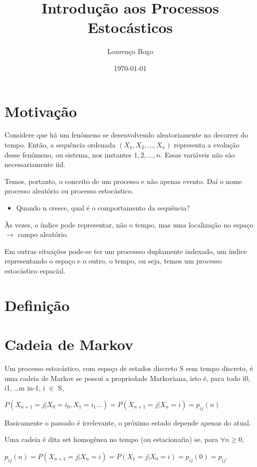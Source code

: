 \documentclass[11pt]{article}
\author{Lourenço Bogo}
\date{\today}
\title{Introdução aos Processos Estocásticos}
\begin{document}
\maketitle

\section{Motivação}
\label{sec:org6c1afc7}
Considere que há um fenômeno se desenvolvendo aleatoriamente no decorrer do tempo.
Então, a sequência ordenada \((X_1, X_2, \dots, X_n)\) representa a evolução desse fenômeno, ou sistema, nos instantes \(1, 2, \dots, n\).
Essas variáveis não são necessariamente iid.

Temos, portanto, o conceito de um processo e não apenas evento. Daí o nome processo aleatório ou processo estocástico.

\begin{itemize}
\item Quando n cresce, qual é o comportamento da sequência?
\end{itemize}

Às vezes, o índice pode representar, não o tempo, mas uma localização no espaço \(\rightarrow\) campo aleatório.

Em outras situações pode-se ter um processso duplamente indexado, um índice representando o espaço e o outro, o tempo, ou seja, temos um processo estocástico espacial.

\section{Definição}
\label{sec:orgdbad375}
\section{Cadeia de Markov}
\label{sec:orge80c14c}
Um processo estocástico, com espaço de estados discreto S eem tempo discreto, é uma cadeia de Markov se possui a propriedade Markoviana, isto é, para todo i0, i1, \ldots{}m in-1, i \(\in\) S,

\(P(X_{n+1} = j | X_0 = i_0, X_1 = i_1 ...) = P(X_{n+1} = j | X_n = i) = p_{ij}(n)\)

Basicamente o passado é irrelevante, o próximo estado depende apenas do atual.

Uma cadeia é dita set homogênea no tempo (ou estacionaŕia) se, para \(\forall n \geq 0\),

\(p_{ij}(n) = P(X_{n+1} = j | X_n = i) = P(X_1 = j | X_0 = i) = p_{ij}(0) = p_{ij}\).
\end{document}
